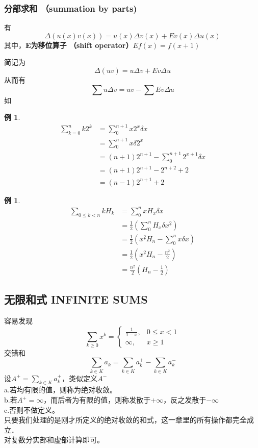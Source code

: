 \documentclass[12pt, a4paper, oneside]{ctexbook}
\newtheorem{example}[theorem]{例}
\begin{document}
\subsubsection{分部求和 （summation by parts)}

有
$$
\Delta(u(x)v(x))=u(x)\Delta v(x)+Ev(x)\Delta u(x)
$$
其中，\textbf{E为移位算子 （shift operator）}$Ef(x)=f(x+1)$

简记为
$$
\Delta(uv)=u\Delta v+Ev \Delta u
$$
从而有
$$
\sum u\Delta v=uv-\sum Ev\Delta u
$$
如
\begin{example}
  $$
\begin{aligned}
\sum_{k=0}^{n}k 2^k&=\sum_{0}^{n+1}x2^x\delta x\\
&=\sum_{0}^{n+1}x\delta 2^x\\
&=(n+1)2^{n+1}-\sum_{0}^{n+1}2^{x+1}\delta x\\
&=(n+1)2^{n+1}-2^{n+2}+2\\
&=(n-1)2^{n+1}+2
\end{aligned}
$$
\end{example}

\begin{example}
  $$
\begin{aligned}
\sum_{0\le k< n} k H_k&=\sum_{0}^{n} xH_x \delta x\\
&=\frac{1}{2}\left( \sum_0^n H_x\delta x^{\underline{2}}  \right)\\
&=\frac{1}{2}\left( x^{\underline{2}} H_n- \sum_0^n x \delta x  \right)\\
&=\frac{1}{2}\left( x^{\underline{2}} H_n- \frac{n^{\underline{2}}}{2}  \right)\\
&=\frac{n^{\underline{2}}}{2} \left(H_n-\frac{1}{2} \right)
\end{aligned}
$$
\end{example}

\subsection{无限和式 INFINITE SUMS}

容易发现
$$
\sum_{k\ge0} x^k=
\begin{cases}
\frac{1}{1-x},& 0\le x<1\\
\infty ,& x\ge1
\end{cases}
$$
交错和
$$
\sum_{k\in K}a_k =\sum_{k\in K}a_k^{+}-\sum_{k\in K} a_k^{-}
$$
设$A^{+}=\sum_{k\in K}a_k^{+} $，类似定义$A^{-}$\\

a.若均有限的值，则称为绝对收敛。\\
b.若$A^{+}=\infty$，而后者为有限的值，则称发散于$+\infty$，反之发散于$-\infty$\\
c.否则不做定义。\\

只要我们处理的是刚才所定义的绝对收敛的和式，这一章里的所有操作都完全成立．\\

对复数分实部和虚部计算即可。\\
\end{document}
